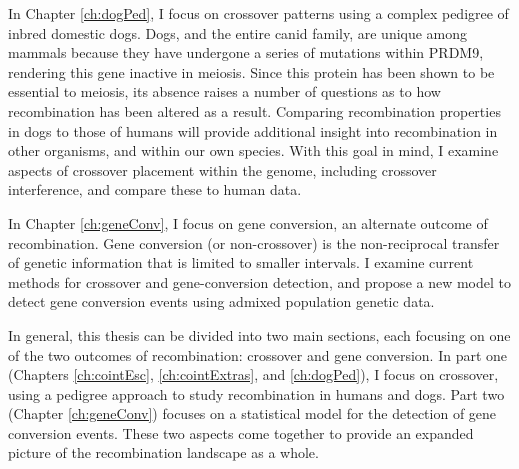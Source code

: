 In Chapter \ref{ch:dogPed}, I focus on crossover patterns using a complex pedigree of inbred domestic dogs.
Dogs, and the entire canid family, are unique among mammals because they have undergone a series of mutations within PRDM9, rendering this gene inactive in meiosis.
Since this protein has been shown to be essential to meiosis, its absence raises a number of questions as to how recombination has been altered as a result.
Comparing recombination properties in dogs to those of humans will provide additional insight into recombination in other organisms, and within our own species.
With this goal in mind, I examine aspects of crossover placement within the genome, including crossover interference, and compare these to human data.


In Chapter \ref{ch:geneConv}, I focus on gene conversion, an alternate outcome of recombination.
Gene conversion (or non-crossover) is the non-reciprocal transfer of genetic information that is limited to smaller intervals.
I examine current methods for crossover and gene-conversion detection, and propose a new model to detect gene conversion events using admixed population genetic data.

In general, this thesis can be divided into two main sections, each focusing on one of the two outcomes of recombination: crossover and gene conversion.
In part one (Chapters \ref{ch:cointEsc}, \ref{ch:cointExtras}, and \ref{ch:dogPed}), I focus on crossover, using a pedigree approach to study recombination in humans and dogs.
Part two (Chapter \ref{ch:geneConv}) focuses on a statistical model for the detection of gene conversion events.
These two aspects come together to provide an expanded picture of the recombination landscape as a whole.





